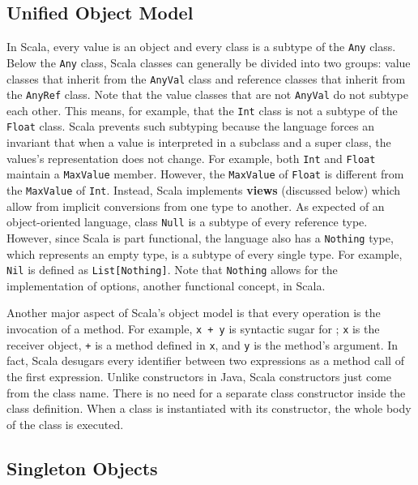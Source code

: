 \documentclass[jou,apacite]{IEEEtran}
\begin{document}
\subsection{Unified Object Model}
\label{sec:unified-object-model}

In Scala, every value is an object and every class is a subtype of the
\texttt{Any} class. Below the \texttt{Any} class, Scala classes can generally be
divided into two groups: value classes that inherit from the \texttt{AnyVal}
class and reference classes that inherit from the \texttt{AnyRef} class. Note
that the value classes that are not \texttt{AnyVal} do not subtype each
other. This means, for example, that the \texttt{Int} class is not a subtype of
the \texttt{Float} class. Scala prevents such subtyping because the language
forces an invariant that when a value is interpreted in a subclass and a super
class, the values's representation does not change. For example, both
\texttt{Int} and \texttt{Float} maintain a \texttt{MaxValue} member. However,
the \texttt{MaxValue} of \texttt{Float} is different from the \texttt{MaxValue}
of \texttt{Int}. Instead, Scala implements \textbf{views} (discussed below)
which allow from implicit conversions from one type to another. As expected of
an object-oriented language, class \texttt{Null} is a subtype of every reference
type. However, since Scala is part functional, the language also has a
\texttt{Nothing} type, which represents an empty type, is a subtype of every
single type. For example, \texttt{Nil} is defined as
\texttt{List[Nothing]}. Note that \texttt{Nothing} allows for the implementation
of options, another functional concept, in Scala.

Another major aspect of Scala's object model is that every operation is the
invocation of a method. For example, \texttt{x + y} is syntactic sugar for
; \texttt{x} is the receiver object, \texttt{+} is a method defined
in \texttt{x}, and \texttt{y} is the method's argument. In fact, Scala desugars
every identifier between two expressions as a method call of the first
expression. Unlike constructors in Java, Scala constructors just come from the
class name. There is no need for a separate class constructor inside the class
definition. When a class is instantiated with its constructor, the whole body of
the class is executed.

\subsection{Singleton Objects}
\label{sec:singleton-objects}
\end{document}

